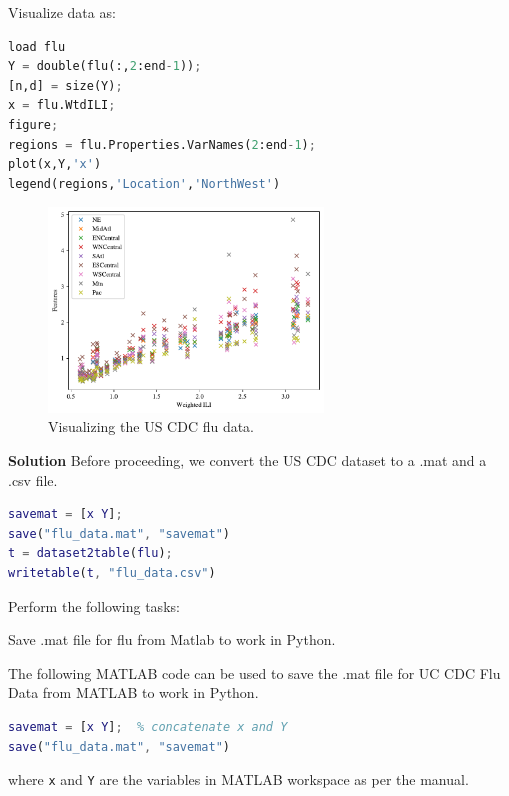 \documentclass[11pt,a4paper]{article}
\begin{document}
Visualize data as:

\begin{lstlisting}[language=Python]
load flu
Y = double(flu(:,2:end-1));
[n,d] = size(Y);
x = flu.WtdILI;
figure;
regions = flu.Properties.VarNames(2:end-1);
plot(x,Y,'x')
legend(regions,'Location','NorthWest')
\end{lstlisting}

\begin{figure}[ht!]
  \centering
  \includegraphics[width=0.65\textwidth]{figs/flu_data.pdf}
  \caption{Visualizing the US CDC flu data.}
\end{figure}

\hrulefill

\textbf{Solution}
Before proceeding, we convert the US CDC dataset to a .mat and a .csv file.

\begin{lstlisting}[language=Matlab]
% Export files
savemat = [x Y];
save("flu_data.mat", "savemat")
t = dataset2table(flu);
writetable(t, "flu_data.csv")
\end{lstlisting}

\hrulefill

Perform the following tasks:

\enumerate[leftmargin=*]
\item Save .mat file for flu from Matlab to work in Python.

The following MATLAB code can be used to save the .mat file for UC CDC Flu Data from MATLAB to work in Python.

\begin{lstlisting}[language=Matlab]
savemat = [x Y];  % concatenate x and Y
save("flu_data.mat", "savemat")
\end{lstlisting}

where \lstinline{x} and \lstinline{Y} are the variables in MATLAB workspace as per the manual.
\end{document}
